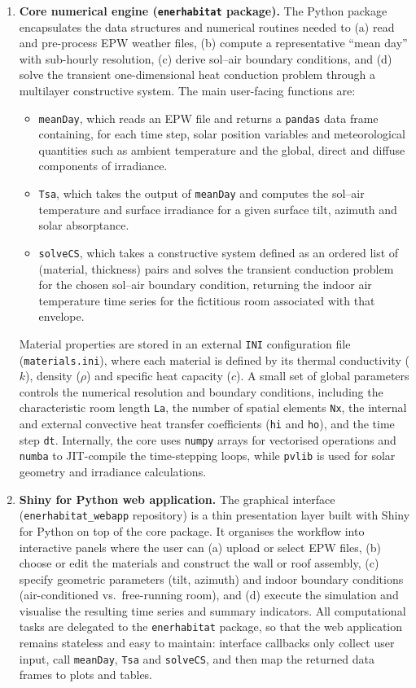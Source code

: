 \documentclass[preprint,12pt, a4paper]{elsarticle}
\begin{document}
\begin{enumerate}
  \item \textbf{Core numerical engine (\texttt{enerhabitat} package).} The Python package encapsulates the data structures and numerical routines needed to (a) read and pre-process EPW weather files, (b) compute a representative ``mean day'' with sub-hourly resolution, (c) derive sol--air boundary conditions, and (d) solve the transient one-dimensional heat conduction problem through a multilayer constructive system. The main user-facing functions are:
  \begin{itemize}
    \item \texttt{meanDay}, which reads an EPW file and returns a \texttt{pandas} data frame containing, for each time step, solar position variables and meteorological quantities such as ambient temperature and the global, direct and diffuse components of irradiance.
    \item \texttt{Tsa}, which takes the output of \texttt{meanDay} and computes the sol--air temperature and surface irradiance for a given surface tilt, azimuth and solar absorptance.
    \item \texttt{solveCS}, which takes a constructive system defined as an ordered list of (material, thickness) pairs and solves the transient conduction problem for the chosen sol--air boundary condition, returning the indoor air temperature time series for the fictitious room associated with that envelope.
  \end{itemize}
  Material properties are stored in an external \texttt{INI} configuration file (\texttt{materials.ini}), where each material is defined by its thermal conductivity (\(k\)), density (\(\rho\)) and specific heat capacity (\(c\)). A small set of global parameters controls the numerical resolution and boundary conditions, including the characteristic room length \texttt{La}, the number of spatial elements \texttt{Nx}, the internal and external convective heat transfer coefficients (\texttt{hi} and \texttt{ho}), and the time step \texttt{dt}. Internally, the core uses \texttt{numpy} arrays for vectorised operations and \texttt{numba} to JIT-compile the time-stepping loops, while \texttt{pvlib} is used for solar geometry and irradiance calculations.
  
  \item \textbf{Shiny for Python web application.} The graphical interface (\texttt{enerhabitat\_webapp} repository) is a thin presentation layer built with Shiny for Python on top of the core package. It organises the workflow into interactive panels where the user can (a) upload or select EPW files, (b) choose or edit the materials and construct the wall or roof assembly, (c) specify geometric parameters (tilt, azimuth) and indoor boundary conditions (air-conditioned vs.\ free-running room), and (d) execute the simulation and visualise the resulting time series and summary indicators. All computational tasks are delegated to the \texttt{enerhabitat} package, so that the web application remains stateless and easy to maintain: interface callbacks only collect user input, call \texttt{meanDay}, \texttt{Tsa} and \texttt{solveCS}, and then map the returned data frames to plots and tables.
  

\end{enumerate}
\end{document}
